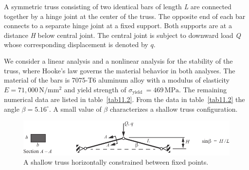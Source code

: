 \documentclass{AeroStructure-ERJohnson}
\begin{document}
\begin{example}\label{ex11.3}%
A symmetric truss consisting of two identical bars of length \textit{L} are connected together by a hinge joint at the center of the truss. The opposite end of each bar connects to a separate hinge joint at a fixed support.\vadjust{\vspace*{8pt}\pagebreak} Both supports are at a distance \textit{H} below central joint. The central joint is subject to downward load \textit{Q} whose corresponding displacement is denoted by $q$.

We consider a linear analysis and a nonlinear analysis for the stability of the truss, where Hooke's law governs the material behavior in both analyses. The material of the bars is 7075-T6 aluminum alloy with a modulus of elasticity $E=71{,}000\,\mathrm{N}/\mathrm{mm}^{2}$ and yield strength of $\sigma_{\text {yield }}=469\,\textrm{MPa}$. The remaining numerical data are listed in table~\ref{tab11.2}. From the data in table~\ref{tab11.2} the angle $\beta=5.16^{\circ}$. A small value of $\beta$ characterizes a shallow truss configuration.

\begin{figure}[!h]
\centerline{\includegraphics{Figure_11-10.pdf}}
\caption{A shallow truss horizontally constrained between fixed points.} \label{fig11.10}
\end{figure}

\begin{table}[!h]
\vspace*{-1pc}
\end{table}


\end{example}
\end{document}
